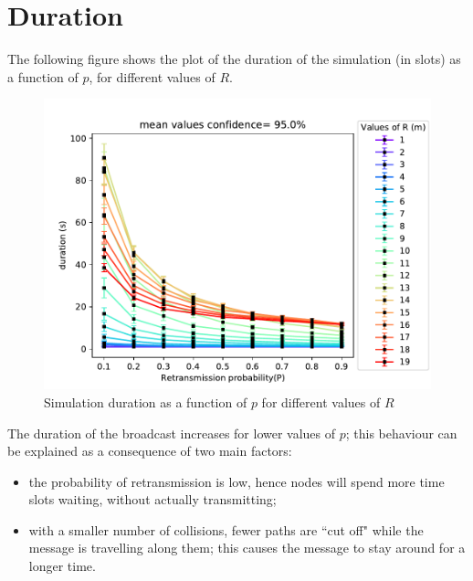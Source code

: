 \section{Duration}\label{sec:duration}
The following figure shows the plot of the duration of the simulation (in
slots) as a function of $p$, for different values of $R$.
\begin{figure}[H]
    \begin{center}
        \includegraphics[scale=.7]{img/big_duration (s)_p_mean_95.0.pdf}
    \end{center}
    \vspace*{-0.5cm}
    \caption{Simulation duration as a function of $p$ for different values of $R$}
    \label{fig:durationPR}
\end{figure}
\noindent
The duration of the broadcast increases for lower values of $p$; this behaviour can be
explained as a consequence of two main factors:
\begin{itemize}
    \item the probability of retransmission is low, hence nodes will spend more
    time slots waiting, without actually transmitting;
    \item with a smaller number of collisions, fewer paths are ``cut off" while the message is travelling along them; this causes the message to stay around for a longer time.
\end{itemize}


